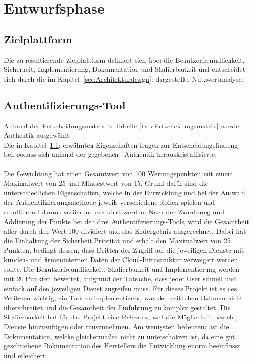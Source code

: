 \section{Entwurfsphase} 
\label{sec:Entwurfsphase}

\subsection{Zielplattform}
\label{sec:Zielplattform}
Die zu resultierende Zielplattform definiert sich über die Benutzerfreundlichkeit, Sicherheit, Implementierung, 
Dokumentation und Skalierbarkeit und entscheidet sich durch die im Kapitel~\ref{sec:Architekturdesign}:  
dargestellte Nutzwertanalyse.


\subsection{Authentifizierungs-Tool}
\label{sec:Authentifizierungs-Tool}
Anhand der Entscheidungsmatrix in Tabelle~\ref{tab:Entscheidungsmatrix} wurde Authentik ausgewählt. 
\\Die in Kapitel~\ref{sec:Zielplattform}:  erwähnten Eigenschaften tragen zur Entscheidungsfindung bei, sodass 
sich anhand der gegebenen~ Authentik herauskristallisierte.
\\
\\Die Gewichtung hat einen Gesamtwert von 100 Wertungspunkten mit einem Maximalwert von 25 und Mindestwert von 15. Grund dafür sind die 
unterschiedlichen Eigenschaften, welche in der Entwicklung und bei der Auswahl der Authentifizierungsmethode jeweils verschiedene Rollen 
spielen und resultierend daraus variierend evaluiert werden. Nach der Zuordnung und Addierung der Punkte bei den drei Authentifizierungs-Tools, 
wird die Gesamtheit aller durch den Wert 100 dividiert und das Endergebnis ausgerechnet. Dabei hat die Einhaltung der Sicherheit Priorität und 
erhält den Maximalwert von 25 Punkten, bedingt dessen, dass Dritten der Zugriff auf die jeweiligen Dienste mit kunden- und firmeninternen Daten 
der Cloud-Infrastruktur verweigert werden sollte. 
Die Benutzerfreundlichkeit, Skalierbarkeit und Implementierung werden mit 20 Punkten bewertet, aufgrund der Tatsache, dass jeder User schnell und 
einfach auf den jeweiligen Dienst zugreifen muss. Für dieses Projekt ist es des Weiteren wichtig, ein Tool zu implementieren, was den 
zeitlichen Rahmen nicht überschreitet und die Gesamtheit der Einführung zu komplex gestaltet. Die Skalierbarkeit hat für das Projekt eine 
Relevanz, weil die Möglichkeit besteht, Dienste hinzuzufügen oder rauszunehmen. Am wenigsten bedeutend ist die Dokumentation, welche 
gleichermaßen nicht zu unterschätzen ist, da eine gut geschriebene Dokumentation des Herstellers die Entwicklung enorm beeinflusst und erleichert.

